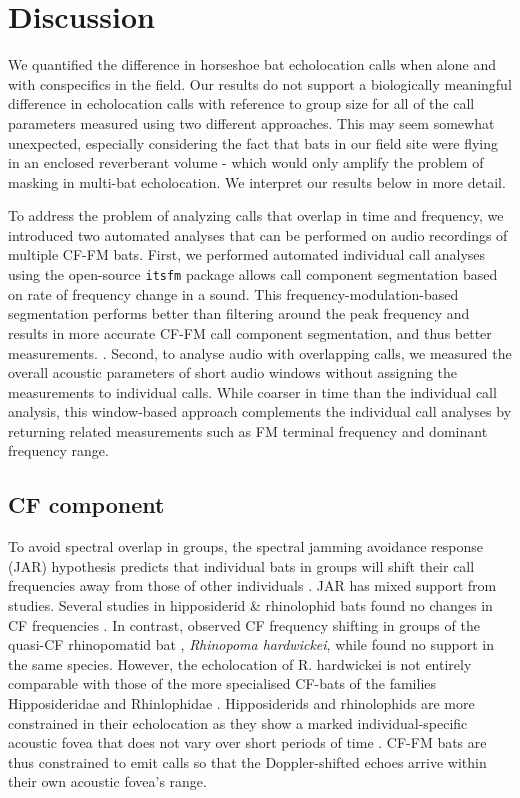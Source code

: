 \documentclass[
]{book}
\begin{document}
\hypertarget{discussion-1}{%
\section{Discussion}\label{discussion-1}}

We quantified the difference in horseshoe bat echolocation calls when alone and with conspecifics in the field. Our results do not support a biologically meaningful difference in echolocation calls with reference to group size for all of the call parameters measured using two different approaches. This may seem somewhat unexpected, especially considering the fact that bats in our field site were flying in an enclosed reverberant volume - which would only amplify the problem of masking in multi-bat echolocation. We interpret our results below in more detail.

To address the problem of analyzing calls that overlap in time and frequency, we introduced two automated analyses that can be performed on audio recordings of multiple CF-FM bats. First, we performed automated individual call analyses using the open-source \texttt{itsfm} package allows call component segmentation based on rate of frequency change in a sound. This frequency-modulation-based segmentation performs better than filtering around the peak frequency and results in more accurate CF-FM call component segmentation, and thus better measurements. \citep{itsfmcitation}. Second, to analyse audio with overlapping calls, we measured the overall acoustic parameters of short audio windows without assigning the measurements to individual calls. While coarser in time than the individual call analysis, this window-based approach complements the individual call analyses by returning related measurements such as FM terminal frequency and dominant frequency range.

\hypertarget{cf-component}{%
\subsection{CF component}\label{cf-component}}

To avoid spectral overlap in groups, the spectral jamming avoidance response (JAR) hypothesis predicts that individual bats in groups will shift their call frequencies away from those of other individuals \citep{ulanovsky2004a}. JAR has mixed support from studies. Several studies in hipposiderid \& rhinolophid bats found no changes in CF frequencies \citep{jones1993a, jones1994individual, fawcett2015clutter, pye1972bimodal}. In contrast, \citet{habersetzer1981a} observed CF frequency shifting in groups of the quasi-CF rhinopomatid bat , \emph{Rhinopoma hardwickei}, while \citet{cvikel2015b} found no support in the same species. However, the echolocation of R. hardwickei is not entirely comparable with those of the more specialised CF-bats of the families Hipposideridae and Rhinlophidae \citep{simmons1984echolocation}. Hipposiderids and rhinolophids are more constrained in their echolocation as they show a marked individual-specific acoustic fovea that does not vary over short periods of time \citep{neuweiler2000biology, schnitzler1976peripheral}. CF-FM bats are thus constrained to emit calls so that the Doppler-shifted echoes arrive within their own acoustic fovea's range.
\end{document}
